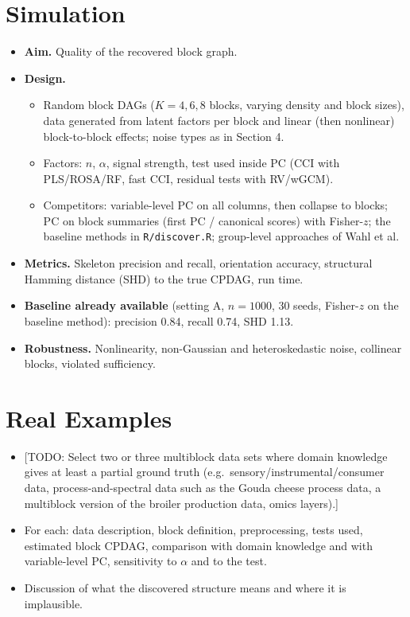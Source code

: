 \documentclass[10pt,leqno]{amsart}
\newcommand{\todo}[1]{{\color{red}[TODO: #1]}}
\begin{document}
\section{Simulation}
\begin{itemize}
\item \textbf{Aim.} Quality of the recovered block graph.
\item \textbf{Design.}
  \begin{itemize}
  \item Random block DAGs ($K=4,6,8$ blocks, varying density and block sizes),
    data generated from latent factors per block and linear (then nonlinear)
    block-to-block effects; noise types as in Section 4.
  \item Factors: $n$, $\alpha$, signal strength, test used inside PC
    (CCI with PLS/ROSA/RF, fast CCI, residual tests with RV/wGCM).
  \item Competitors: variable-level PC on all columns, then collapse to blocks;
    PC on block summaries (first PC / canonical scores) with Fisher-$z$; the
    baseline methods in \texttt{R/discover.R}; group-level approaches of Wahl et al.
  \end{itemize}
\item \textbf{Metrics.} Skeleton precision and recall, orientation accuracy,
  structural Hamming distance (SHD) to the true CPDAG, run time.
\item \textbf{Baseline already available} (setting A, $n=1000$, 30 seeds, Fisher-$z$ on the
  baseline method): precision 0.84, recall 0.74, SHD 1.13.
\item \textbf{Robustness.} Nonlinearity, non-Gaussian and heteroskedastic noise,
  collinear blocks, violated sufficiency.
\end{itemize}

\section{Real Examples}
\begin{itemize}
\item \todo{Select two or three multiblock data sets where domain knowledge gives
  at least a partial ground truth (e.g.\ sensory/instrumental/consumer data,
  process-and-spectral data such as the Gouda cheese process data, a multiblock
  version of the broiler production data, omics layers).}
\item For each: data description, block definition, preprocessing, tests used,
  estimated block CPDAG, comparison with domain knowledge and with variable-level
  PC, sensitivity to $\alpha$ and to the test.
\item Discussion of what the discovered structure means and where it is implausible.
\end{itemize}
\end{document}
